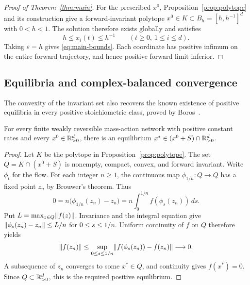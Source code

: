 \begin{proof}[Proof of Theorem~\ref{thm:main}]
For the prescribed $x^0$, Proposition~\ref{prop:polytope} and its
construction give a forward-invariant polytope
$x^0\in K\subset B_h=[h,h^{-1}]^d$ with $0<h<1$. The solution
therefore exists globally and satisfies
\[
 h\le x_i(t)\le h^{-1}\qquad(t\ge0,\ 1\le i\le d).
\]
Taking $\varepsilon=h$ gives \eqref{eq:main-bounds}. Each coordinate
has positive infimum on the entire forward trajectory, and hence
positive forward limit inferior.
\end{proof}

\subsection{Equilibria and complex-balanced convergence}

The convexity of the invariant set also recovers the known existence of
positive equilibria in every positive stoichiometric class, proved by
Boros~\cite[preprint, Theorem~1]{Boros2019}.

\begin{corollary}\label{cor:positive-equilibrium}
For every finite weakly reversible mass-action network with positive
constant rates and every $x^0\in\mathbb R_{>0}^d$, there is an equilibrium
$x^*\in(x^0+S)\cap\mathbb R_{>0}^d$.
\end{corollary}

\begin{proof}
Let $K$ be the polytope in Proposition~\ref{prop:polytope}. The set
$Q=K\cap(x^0+S)$ is nonempty, compact, convex, and forward invariant.
Write $\phi_t$ for the flow. For each integer $n\ge1$, the continuous
map $\phi_{1/n}:Q\to Q$ has a fixed point $z_n$ by Brouwer's theorem.
Thus
\[
 0=n\bigl(\phi_{1/n}(z_n)-z_n\bigr)
   =n\int_0^{1/n}f(\phi_s(z_n))\,ds.
\]
Put $L=\max_{z\in Q}\lVert f(z)\rVert$. Invariance and the integral equation
give $\lVert\phi_s(z_n)-z_n\rVert\le L/n$ for $0\le s\le1/n$.
Uniform continuity of $f$ on $Q$ therefore yields
\[
 \lVert f(z_n)\rVert
 \le\sup_{0\le s\le1/n}\lVert f(\phi_s(z_n))-f(z_n)\rVert
 \longrightarrow0.
\]
A subsequence of $z_n$ converges to some $x^*\in Q$, and continuity gives
$f(x^*)=0$. Since $Q\subset\mathbb R_{>0}^d$, this is the required positive
equilibrium.
\end{proof}

